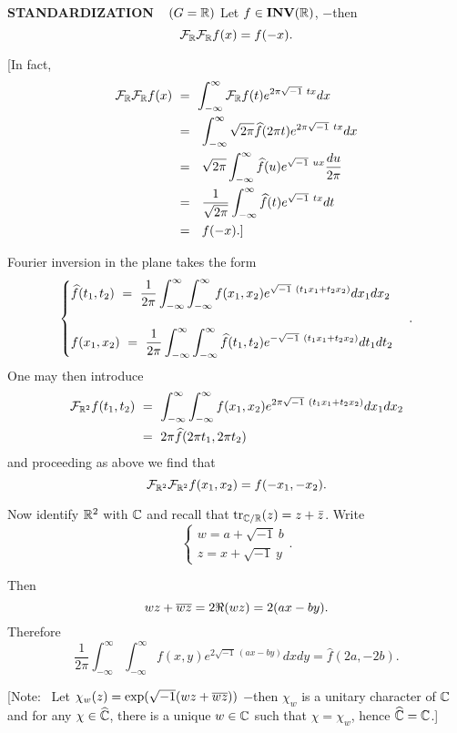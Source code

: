 \begin{x}{\small\bf STANDARDIZATION} \ %
$(G = \mathbb{R})$ Let $f \in \mathbf{INV}(\mathbb{R})$, $-$then
\[
\mathcal{F}_{\mathbb{R}} \mathcal{F}_{\mathbb{R}} f(x) = f(-x).
\]

[In fact,
\begin{align*}
\sF_\R \sF_\R f(x)	 \ 
&=\  \int_{-\infty}^\infty \sF_\R f(t) e^{2 \pi \sqrt{-1}\  tx} dx \\	
&=\  \ \int_{-\infty}^\infty \sqrt{2\pi} \widehat{f}(2 \pi t) e^{2 \pi \sqrt{-1}\  tx} dx \\	
&=\  \ \sqrt{2\pi}  \int_{-\infty}^\infty  \widehat{f}(u) e^{\sqrt{-1}\  ux} \frac{du}{2\pi} \\	
&=\  \ \frac{1}{\sqrt{2\pi}}  \int_{-\infty}^\infty  \widehat{f}(t) e^{\sqrt{-1}\  tx} dt \\	
&=\  \ f(-x).]
\end{align*}

\vspace{0.1cm}

Fourier inversion in the plane takes the form
\[
\begin{cases}
\widehat{f}(t_1, t_2)  \
= \ \ds\frac{1}{2\pi} \int_{-\infty}^\infty \int_{-\infty}^\infty f(x_1, x_2) e^{\sqrt{-1}\  (t_1x_1 + t_2x_2)} dx_1 dx_2\\
\\
f(x_1, x_2)  \ 
= \ \ds\frac{1}{2\pi} \int_{-\infty}^\infty \int_{-\infty}^\infty \widehat{f}(t_1, t_2) e^{-\sqrt{-1}\  (t_1x_1 + t_2x_2)} dt_1 dt_2
\end{cases}
.
\]
One may then introduce
\begin{align*}
\sF_{\R^2}f(t_1,t_2) \ 
&= \ \int_{-\infty}^\infty \int_{-\infty}^\infty f(x_1, x_2) e^{2\pi\sqrt{-1}\  (t_1x_1 + t_2x_2)} dx_1 dx_2 \\
&= \ 2\pi \widehat{f} (2\pi t_1, 2\pi t_2)
\end{align*}
and proceeding as above we find that
\[
\mathcal{F}_{\mathbb{R}^2} \mathcal{F}_{\mathbb{R}^2} f(x_1, x_2) = f(-x_1, -x_2).
\]

Now identify $\mathbb{R}^2$ with $\mathbb{C}$ and recall that $\text{tr}_{\mathbb{C} /\mathbb{R}} (z) = z + \bar{z}$.  
Write
\[
\begin{cases}
w = a + \sqrt{-1} \ b\\
z = x + \sqrt{-1}  \ y
\end{cases}
.
\]

Then
\[
wz + \overline{wz} = 2\Re(wz) = 2(ax -by). 
\]
Therefore
\[
\frac{1}{2\pi} \int_{-\infty}^\infty \int_{-\infty}^\infty f(x,y) e^{2 \sqrt{-1}\ (ax-by)}dx dy = \widehat{f}(2a, -2b).
\]

\vspace{0.1cm}

[Note: \  Let $\chi_w(z) = \exp(\sqrt{-1}(wz + \overline{wz}))$ 
$-$then $\chi_w$ is a unitary character of $\mathbb{C}$ and for any $\chi \in \widehat{\mathbb{C}}$, 
there is a unique $w \in \mathbb{C}$ such that $\chi = \chi_w$, hence $\widehat{\mathbb{C}} = \mathbb{C}$.]\\
\end{x}

